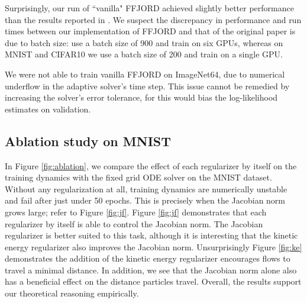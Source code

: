 \documentclass{article}
\theoremstyle{definition}
\theoremstyle{remark}
\begin{document}
Surprisingly, our run of ``vanilla" FFJORD achieved slightly better performance than the results reported in \cite{grathwohl_ffjord}.
We suspect the discrepancy in performance and run times between our implementation of FFJORD
and that of the original paper is due to batch size:
\citeauthor{grathwohl_ffjord} use a batch size of 900 and train on six GPUs,
whereas on MNIST and CIFAR10 we use a batch size of 200 and train on a single GPU.

We were not able to train vanilla FFJORD on ImageNet64, due to numerical
underflow in the adaptive solver's time step. This issue cannot be remedied by
increasing the solver's error tolerance, for this would bias the log-likelihood
estimates on validation.






\subsection{Ablation study on MNIST}
In Figure \ref{fig:ablation}, we compare the effect of each regularizer by itself on the training
dynamics with the fixed grid ODE solver on the MNIST dataset. Without any
regularization at all, training dynamics are numerically unstable and fail after
just under 50 epochs. This is precisely when the Jacobian norm grows large;
refer to Figure \ref{fig:jf}. Figure \ref{fig:jf} demonstrates that each
regularizer by itself is able to control the Jacobian norm. The
Jacobian regularizer is better suited to this task, although it is interesting
that the kinetic energy regularizer also improves the Jacobian norm.
Unsurprisingly Figure \ref{fig:ke} demonstrates the addition of the kinetic energy regularizer
encourages flows to travel a minimal distance. In addition, we see that the
Jacobian norm alone also has a beneficial effect on the distance particles
travel. Overall, the results support our theoretical reasoning empirically.
\end{document}
